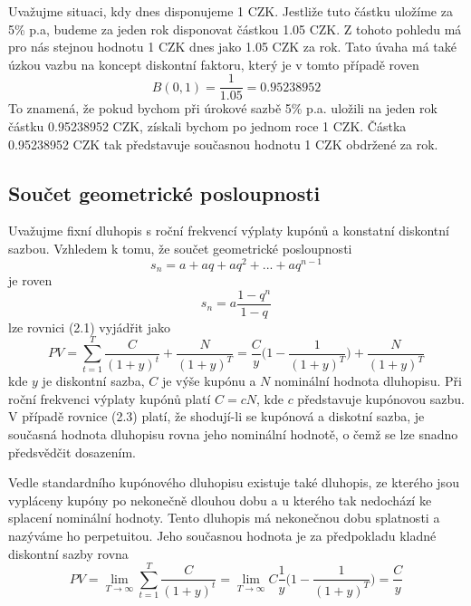 \documentclass[a4paper]{book}
\begin{document}
Uvažujme situaci, kdy dnes disponujeme 1 CZK. Jestliže tuto částku uložíme za 5\% p.a, budeme za jeden rok disponovat částkou 1.05 CZK. Z tohoto pohledu má pro nás stejnou hodnotu 1 CZK dnes jako 1.05 CZK za rok. Tato úvaha má také úzkou vazbu na koncept diskontní faktoru, který je v tomto případě roven
\begin{equation*}
B(0,1) = \frac{1}{1.05} = 0.95238952
\end{equation*}
To znamená, že pokud bychom při úrokové sazbě 5\% p.a. uložili na jeden rok částku 0.95238952 CZK, získali bychom po jednom roce 1 CZK. Částka 0.95238952 CZK tak představuje současnou hodnotu 1 CZK obdržené za rok.

\subsection{Součet geometrické posloupnosti}

Uvažujme fixní dluhopis s roční frekvencí výplaty kupónů a konstatní diskontní sazbou. Vzhledem k tomu, že součet geometrické posloupnosti
\begin{equation*}
s_n = a + aq + aq^2 + ... + aq^{n-1} 
\end{equation*}
je roven
\begin{equation*}
s_n = a \frac{1 - q^n}{1 - q}
\end{equation*}
lze rovnici (2.1) vyjádřit jako
\begin{equation}
PV = \sum_{t = 1}^T \frac{C}{(1 + y)^t} + \frac{N}{(1 + y)^T} = \frac{C}{y} \Bigg( 1 - \frac{1}{(1 + y)^T}\Bigg) + \frac{N}{(1 + y)^T}
\end{equation}
kde $y$ je diskontní sazba, $C$ je výše kupónu a $N$ nominální hodnota dluhopisu. Při roční frekvenci výplaty kupónů platí $C = cN$, kde $c$ představuje kupónovou sazbu. V případě rovnice (2.3) platí, že shodují-li se kupónová a diskotní sazba, je současná hodnota dluhopisu rovna jeho nominální hodnotě, o čemž se lze snadno předsvědčit dosazením.

Vedle standardního kupónového dluhopisu existuje také dluhopis, ze kterého jsou vypláceny kupóny po nekonečně dlouhou dobu a u kterého tak nedochází ke splacení nominální hodnoty. Tento dluhopis má nekonečnou dobu splatnosti a nazýváme ho perpetuitou. Jeho současnou hodnota je za předpokladu kladné diskontní sazby rovna
\begin{equation*}
PV = \underset{T \rightarrow \infty}\lim \sum_{t=1}^T \frac{C}{(1 + y)^t} = \underset{T \rightarrow \infty}\lim C \frac{1}{y}\Bigg( 1 - \frac{1}{(1 + y)^T} \Bigg) = \frac{C}{y}
\end{equation*}
\end{document}
